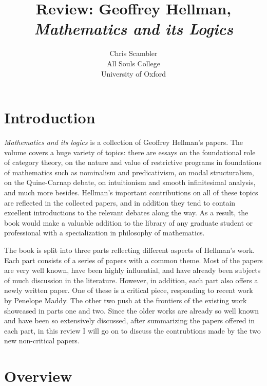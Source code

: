 \documentclass{article}
\title{Review: Geoffrey Hellman, \emph{Mathematics and its Logics}}
\author{Chris Scambler 
\\
All Souls College\\
University of Oxford}
\theoremstyle{definition}
\begin{document}
 
\maketitle

\section{Introduction}

\emph{Mathematics and its logics} is a collection of Geoffrey Hellman's papers. 
The volume covers a huge variety of topics:
there are essays on the foundational role of category theory, 
on the nature and value of restrictive programs in foundations of mathematics such as nominalism and predicativism, 
on modal structuralism, on the Quine-Carnap debate, 
on intuitionism and smooth infinitesimal analysis, 
and much more besides. 
Hellman's important contributions on all of these topics are reflected in the collected papers, 
and in addition they tend to contain excellent introductions to the relevant debates along the way.
As a result, 
the book would make a valuable addition to the library of any graduate student or professional with a specialization in philosophy of mathematics. 

The book is split into three parts reflecting different aspects of Hellman's work. 
Each part consists of a series of papers with a common theme.
Most of the papers are very well known, have been highly influential, 
and have already been subjects of much discussion in the literature.
However, in addition, 
each part also offers a newly written paper.
One of these is a critical piece, responding to recent work by Penelope Maddy. 
The other two push at the frontiers of the existing work showcased in parts one and two.
Since the older works are already so well known and have been so extensively discussed, 
after summarizing the papers offered in each part, 
in this review I will go on to discuss the contrubtions made by the two new non-critical papers.

\section{Overview}
\end{document}
